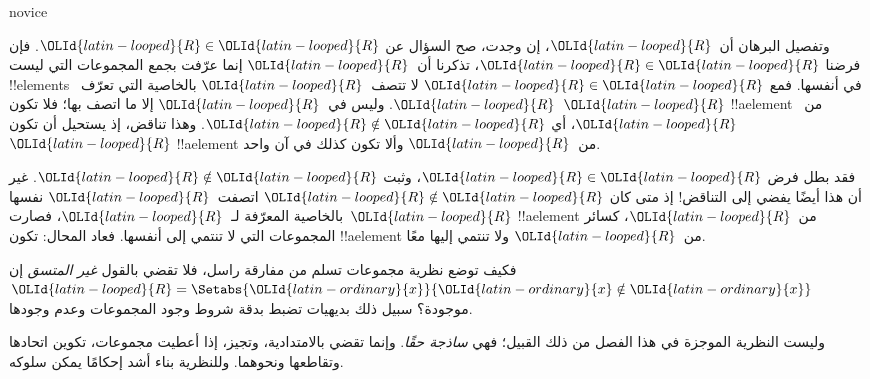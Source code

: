 \documentclass[../../../include/open-logic-section]{subfiles}
\begin{document}
\begin{tagblock}{novice}
\begin{explain}
وتفصيل البرهان أن~${\OLId{latin-looped}{R}}$، إن وجدت، صح السؤال عن ${\OLId{latin-looped}{R}} \in {\OLId{latin-looped}{R}}$.
فإن فرضنا ${\OLId{latin-looped}{R}} \in {\OLId{latin-looped}{R}}$، تذكرنا أن~${\OLId{latin-looped}{R}}$ إنما عرّفت بجمع المجموعات التي
ليست !!{element}s في أنفسها. فمع ${\OLId{latin-looped}{R}} \in {\OLId{latin-looped}{R}}$ لا تتصف~${\OLId{latin-looped}{R}}$ بالخاصية
التي تعرّف~${\OLId{latin-looped}{R}}$. وليس في~${\OLId{latin-looped}{R}}$ إلا ما اتصف بها؛ فلا تكون~${\OLId{latin-looped}{R}}$
!!a{element} من~${\OLId{latin-looped}{R}}$، أي ${\OLId{latin-looped}{R}} \notin {\OLId{latin-looped}{R}}$. وهذا تناقض، إذ يستحيل
أن تكون~${\OLId{latin-looped}{R}}$ !!a{element} من~${\OLId{latin-looped}{R}}$ وألا تكون كذلك في آن واحد.

فقد بطل فرض ${\OLId{latin-looped}{R}} \in {\OLId{latin-looped}{R}}$، وثبت ${\OLId{latin-looped}{R}} \notin {\OLId{latin-looped}{R}}$. غير أن هذا أيضًا
يفضي إلى التناقض!{} إذ متى كان ${\OLId{latin-looped}{R}} \notin {\OLId{latin-looped}{R}}$ اتصفت~${\OLId{latin-looped}{R}}$ نفسها
بالخاصية المعرّفة لـ~${\OLId{latin-looped}{R}}$، فصارت~${\OLId{latin-looped}{R}}$ !!a{element} من~${\OLId{latin-looped}{R}}$، كسائر
المجموعات التي لا تنتمي إلى أنفسها. فعاد المحال: تكون !!a{element}
من~${\OLId{latin-looped}{R}}$ ولا تنتمي إليها معًا.
\end{explain}
\end{tagblock}

\begin{digress}
فكيف توضع نظرية مجموعات تسلم من مفارقة راسل، فلا تقضي بالقول
\emph{غير المتسق} إن ${\OLId{latin-looped}{R}} = \Setabs{{\OLId{latin-ordinary}{x}}}{{\OLId{latin-ordinary}{x}} \notin {\OLId{latin-ordinary}{x}}}$ موجودة؟
سبيل ذلك بديهيات تضبط بدقة شروط وجود المجموعات وعدم وجودها.

وليست النظرية الموجزة في هذا الفصل من ذلك القبيل؛ فهي
\emph{ساذجة حقًا}. %
وإنما تقضي بالامتدادية، وتجيز، إذا أعطيت مجموعات، تكوين اتحادها
وتقاطعها ونحوهما. وللنظرية بناء أشد إحكامًا يمكن سلوكه.
\end{digress}
\end{document}
